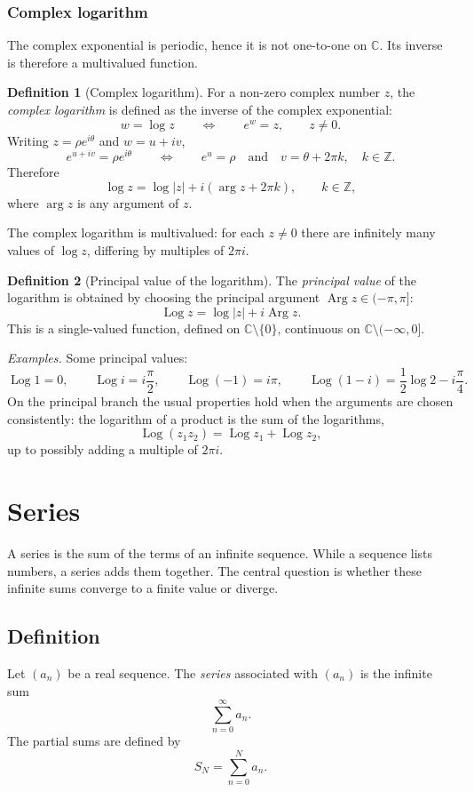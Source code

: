 \documentclass[11pt,a4paper]{article}
\theoremstyle{definition} \newtheorem{definition}{Definition} \theoremstyle{plain} \newtheorem{theorem}{Theorem}
\begin{document}
\subsubsection{Complex logarithm}
The complex exponential is periodic, hence it is not one-to-one on $\mathbb{C}$.
Its inverse is therefore a multivalued function.
\begin{definition}[Complex logarithm] For a non-zero complex number $z$, the \emph{complex logarithm} is defined as the inverse of the complex exponential:
\[ w = \log z \qquad \Longleftrightarrow \qquad e^w = z, \qquad z\neq 0. \]
Writing $z = \rho e^{i\theta}$ and $w = u + iv$,
\[ e^{u+iv} = \rho e^{i\theta} \qquad\Longleftrightarrow\qquad e^u = \rho \quad\text{and}\quad v = \theta + 2\pi k,\quad k\in\mathbb{Z}. \]
Therefore
\[ \log z = \log |z| + i(\arg z + 2\pi k), \qquad k\in\mathbb{Z}, \]
where $\arg z$ is any argument of $z$. \end{definition}
The complex logarithm is multivalued: for each $z\neq 0$ there are infinitely many values of $\log z$, differing by multiples of $2\pi i$.
\begin{definition}[Principal value of the logarithm] The \emph{principal value} of the logarithm is obtained by choosing the principal argument $\operatorname{Arg} z\in(-\pi,\pi]$:
\[ \operatorname{Log} z = \log |z| + i\operatorname{Arg} z. \]
This is a single-valued function, defined on $\mathbb{C}\setminus\{0\}$, continuous on $\mathbb{C}\setminus(-\infty,0]$. \end{definition}
\emph{Examples.} Some principal values:
\[ \operatorname{Log} 1 = 0, \qquad \operatorname{Log} i = i\frac{\pi}{2}, \qquad \operatorname{Log}(-1) = i\pi, \qquad \operatorname{Log}(1-i) = \frac12\log 2 - i\frac{\pi}{4}. \]
On the principal branch the usual properties hold when the arguments are chosen consistently: the logarithm of a product is the sum of the logarithms,
\[ \operatorname{Log}(z_1 z_2) = \operatorname{Log} z_1 + \operatorname{Log} z_2, \]
up to possibly adding a multiple of $2\pi i$.

\clearpage
\section{Series}\label{sec:series}
A series is the sum of the terms of an infinite sequence.
While a sequence lists numbers, a series adds them together.
The central question is whether these infinite sums converge to a finite value or diverge.
\subsection{Definition}
Let $(a_n)$ be a real sequence.
The \emph{series} associated with $(a_n)$ is the infinite sum
\[ \sum_{n=0}^{\infty} a_n. \]
The partial sums are defined by
\[ S_N = \sum_{n=0}^{N} a_n. \]
\end{document}
